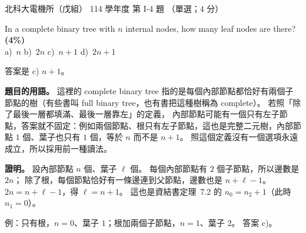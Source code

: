 \begin{pastexam}[label={px:ntut-114-ee-ds-04}]{北科大電機所（戊組） 114 學年度 第 I-4 題}
（單選；4 分）

In a complete binary tree with $n$ internal nodes, how many leaf nodes are there? \textbf{(4\%)}\\
a)~$n$ \qquad b)~$2n$ \qquad c)~$n+1$ \qquad d)~$2n+1$
\end{pastexam}

\begin{pastsoln}
答案是 c) $n + 1$。

\textbf{題目的用語。} 這裡的 complete binary tree 指的是每個內部節點都恰好有兩個子節點的樹（有些書叫
full binary tree，也有書把這種樹稱為 complete）。 若照「除了最後一層都填滿、最後一層靠左」的定義，
內部節點可能有一個只有左子節點，答案就不固定：例如兩個節點、根只有左子節點，這也是完整二元樹，內部節點 $1$ 個、葉子也只有 $1$ 個，等於 $n$ 而不是 $n + 1$。 照這個定義沒有一個選項永遠成立，所以採用前一種讀法。

\textbf{證明。} 設內部節點 $n$ 個、葉子 $\ell$ 個。 每個內部節點有 $2$ 個子節點，所以邊數是 $2n$；
除了根，每個節點恰好有一條邊連到父節點，邊數也是 $n + \ell - 1$。 $2n = n + \ell - 1$，得
$\ell = n + 1$。 這也是資結書定理~7.2 的 $n_0 = n_2 + 1$（此時 $n_1 = 0$）。

例：只有根，$n = 0$、葉子 $1$；根加兩個子節點，$n = 1$、葉子 $2$。 答案 c)。
\end{pastsoln}
